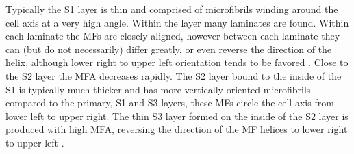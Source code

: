 Typically the S1 layer is thin and comprised of microfibrils winding around the
cell axis at a very high angle. Within the layer many laminates are found.
Within each laminate the MFs are closely aligned, however between each laminate
they can (but do not necessarily) differ greatly, or even reverse the direction
of the helix, although lower right to upper left
orientation tends to be favored \citep{fromm2013cellular}. Close to the S2 layer the MFA decreases
rapidly. The S2 layer bound to the inside of the S1 is typically much thicker and
has more vertically oriented microfibrils compared to the primary, S1 and S3
layers, these MFs circle the cell axis from lower left to upper right. The thin S3 layer formed on the inside of the S2 layer is produced with
high MFA, reversing the direction of the MF helices to lower right to upper
left \citep{walker1993primary}.